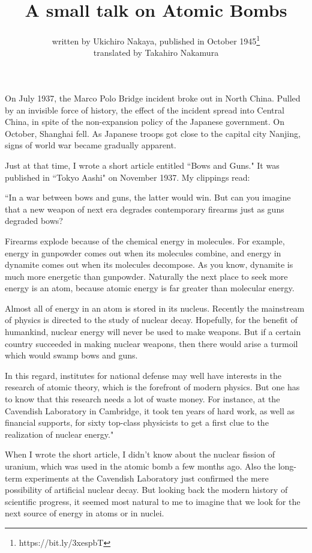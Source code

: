 \documentclass[11pt,a4j,twocolumn]{jarticle}
\title{{\small A small talk on} Atomic Bombs}
\author{written by Ukichiro Nakaya,
published in October 1945\thanks{https://bit.ly/3xespbT}\\
translated by Takahiro Nakamura
}
\date{}
\begin{document}
\baselineskip=14.6pt

\maketitle

\noindent
On July 1937, the Marco Polo Bridge incident broke out in North China.
Pulled by an invisible force of history, 
the effect of the incident spread into Central China, 
in spite of the non-expansion policy of the Japanese government.
On October, Shanghai fell. As Japanese troops got close to the capital city Nanjing,
signs of world war became gradually apparent.

Just at that time, I wrote a short article entitled ``Bows and Guns."
It was published in ``Tokyo Aashi" on November 1937.
My clippings read:

\medskip
``In a war between bows and guns, the latter would win.
But can you imagine that a new weapon of next era
degrades contemporary firearms just as guns degraded bows?

Firearms explode because of the chemical energy in molecules.
For example, energy in gunpowder comes out when its molecules combine,
and energy in dynamite comes out when its molecules decompose.
As you know, dynamite is much more energetic than gunpowder.
Naturally the next place to seek more energy is an atom,
because atomic energy is far greater than molecular energy.

Almost all of energy in an atom is stored in its nucleus.
Recently the mainstream of physics is directed to the study of nuclear decay.
Hopefully, for the benefit of humankind, nuclear energy will never be used to make weapons.
But if a certain country succeeded in making nuclear weapons,
then there would arise a turmoil which would swamp bows and guns.

In this regard, institutes for national defense may well have interests in
the research of atomic theory, which is the forefront of modern physics.
But one has to know that this research needs a lot of waste money.
For instance, at the Cavendish Laboratory in Cambridge,
it took ten years of hard work, as well as financial supports,
for sixty top-class physicists to get a first clue to the realization of nuclear energy."

\medskip
When I wrote the short article, I didn't know about the nuclear fission of uranium,
which was used in the atomic bomb a few months ago.
Also the long-term experiments at the Cavendish Laboratory
just confirmed the mere possibility of artificial nuclear decay.
But looking back the modern history of scientific progress,
it seemed most natural to me to imagine that we look for
the next source of energy in atoms or in nuclei.
\end{document}
